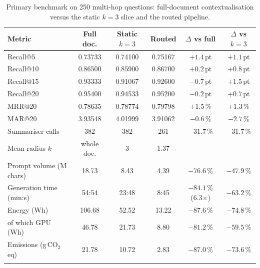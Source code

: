 \documentclass[pdflatex,sn-mathphys-num]{sn-jnl}
\makeatletter
\newcommand{\gco}{g\,CO$_2$eq}
\newcommand{\Rec}[1]{Recall@#1}
\newcommand{\MRR}[1]{MRR@#1}
\newcommand{\MAR}[1]{MAR@#1}
\theoremstyle{thmstyleone}%
\theoremstyle{thmstylethree}%
\makeatother
\begin{document}
\begin{table}[htbp]
\caption{Primary benchmark on 250 multi-hop questions: full-document contextualisation versus the static $k=3$ slice and the routed pipeline.}\label{tab:primary}
\setlength{\tabcolsep}{4pt}
\begin{tabular}{@{}p{3.6cm}ccccc@{}}
\toprule
Metric & Full doc. & Static $k=3$ & Routed & $\Delta$ vs full & $\Delta$ vs $k=3$ \\
\midrule
\Rec{5} & 0.73733 & 0.74100 & 0.75167 & $+1.4$\,pt & $+1.1$\,pt \\
\Rec{10} & 0.86500 & 0.85900 & 0.86700 & $+0.2$\,pt & $+0.8$\,pt \\
\Rec{15} & 0.93333 & 0.91067 & 0.92600 & $-0.7$\,pt & $+1.5$\,pt \\
\Rec{20} & 0.95400 & 0.94533 & 0.95200 & $-0.2$\,pt & $+0.7$\,pt \\
\MRR{20} & 0.78635 & 0.78774 & 0.79798 & $+1.5$\,\% & $+1.3$\,\% \\
\MAR{20} & 3.93548 & 4.01999 & 3.91062 & $-0.6$\,\% & $-2.7$\,\% \\
Summariser calls & 382 & 382 & 261 & $-31.7$\,\% & $-31.7$\,\% \\
Mean radius $\bar k$ & whole doc. & 3 & 1.37 & & \\
Prompt volume (M chars) & 18.73 & 8.43 & 4.39 & $-76.6$\,\% & $-47.9$\,\% \\
Generation time (min:s) & 54:54 & 23:48\footnotemark[1] & 8:45 & $-84.1$\,\% (6.3$\times$) & $-63.2$\,\% \\
Energy (Wh) & 106.68 & 52.52\footnotemark[1] & 13.22 & $-87.6$\,\% & $-74.8$\,\% \\
\quad of which GPU (Wh) & 46.78 & 21.73\footnotemark[1] & 8.80 & $-81.2$\,\% & $-59.5$\,\% \\
Emissions (\gco{}) & 21.78 & 10.72\footnotemark[1] & 2.83 & $-87.0$\,\% & $-73.6$\,\% \\
\botrule
\end{tabular}

\end{table}
\end{document}
